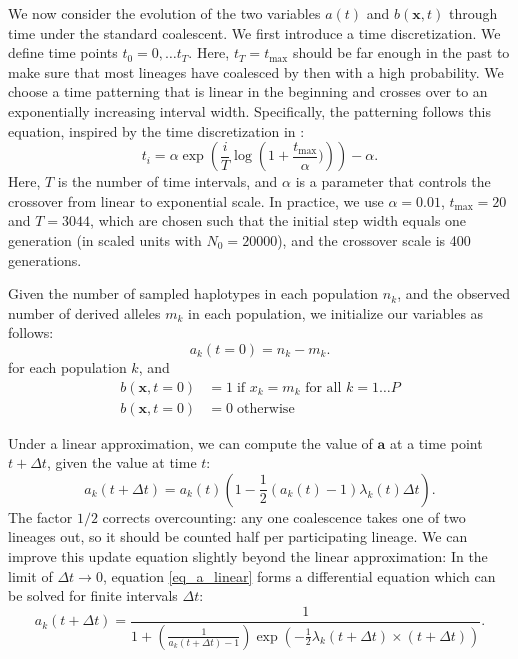 \documentclass[a4paper]{article}
\begin{document}
We now consider the evolution of the two variables $a(t)$ and $b(\mathbf{x}, t)$ through time under the standard coalescent. We first introduce a time discretization. We define time points $t_0=0,\ldots t_T$. Here, $t_T=t_\mathrm{max}$ should be far enough in the past to make sure that most lineages have coalesced by then with a high probability. We choose a time patterning that is linear in the beginning and crosses over to an exponentially increasing interval width. Specifically, the patterning follows this equation, inspired by the time discretization in \cite{Li:2011eza}:
\begin{equation}
    t_i=\alpha \exp\left(\frac{i}{T} \log\left(1 + \frac{t_\mathrm{max}}{\alpha})\right)\right) - \alpha.
\end{equation}
Here, $T$ is the number of time intervals, and $\alpha$ is a parameter that controls the crossover from linear to exponential scale. In practice, we use $\alpha=0.01$, $t_\mathrm{max}=20$ and $T=3044$, which are chosen such that the initial step width equals one generation (in scaled units with $N_0=20000$), and the crossover scale is 400 generations.

Given the number of sampled haplotypes in each population $n_k$, and the observed number of derived alleles $m_k$ in each population, we initialize our variables as follows:
\begin{equation}
    a_k(t=0) = n_k - m_k.
\end{equation}
for each population $k$, and
\begin{align}
    b(\mathbf{x},t=0) &= 1 \;\text{if $x_k=m_k$ for all $k=1 \ldots P$}\\
    b(\mathbf{x},t=0) &= 0 \;\text{otherwise}
\end{align}

Under a linear approximation, we can compute the value of $\mathbf{a}$ at a time point $t+\Delta t$, given the value at time $t$:
\begin{equation}
    \label{eq_a_linear}
a_k(t+\Delta t) = a_k(t) \left(1 - \frac{1}{2}(a_k(t) - 1)\lambda_{k}(t) \Delta t\right).
\end{equation}
The factor $1/2$ corrects overcounting: any one coalescence takes one of two lineages out, so it should be counted half per participating lineage. We can improve this update equation slightly beyond the linear approximation: In the limit of $\Delta t \rightarrow 0$, equation \ref{eq_a_linear} forms a differential equation which can be solved for finite intervals $\Delta t$:
\begin{equation}
a_k(t+\Delta t) = \frac{1}{1 + \left(\frac{1}{a_k(t+\Delta t)-1}\right) \exp\left(-\frac{1}{2}\lambda_k(t+\Delta t)\times(t+\Delta t)\right)}.
\end{equation}
\end{document}
